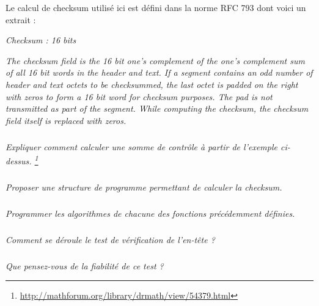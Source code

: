 \documentclass[10pt]{article}
\begin{document}
Le calcul de checksum utilisé ici est défini dans la norme RFC 793 dont voici un extrait : 
\begin{center}
\begin{minipage}[c]{.7\linewidth}
\textit{Checksum : 16 bits}

\noindent\textit{The checksum field is the 16 bit one's complement of the one's
complement sum of all 16 bit words in the header and text. If a
segment contains an odd number of header and text octets to be
checksummed, the last octet is padded on the right with zeros to
form a 16 bit word for checksum purposes. The pad is not
transmitted as part of the segment. While computing the checksum,
the checksum field itself is replaced with zeros.}
\end{minipage}
\end{center}


\subparagraph{}
\textit{Expliquer comment calculer une somme de contrôle à partir de l'exemple ci-dessus. \footnote{\url{http://mathforum.org/library/drmath/view/54379.html}}}


\subparagraph{}
\textit{Proposer une structure de programme permettant de calculer la checksum.}


\subparagraph{}
\textit{Programmer les algorithmes de chacune des fonctions précédemment définies.}

\subparagraph{}
\textit{Comment se déroule le test de vérification de l'en-tête ?}

\subparagraph{}
\textit{Que pensez-vous de la fiabilité de ce test ?}
\end{document}
